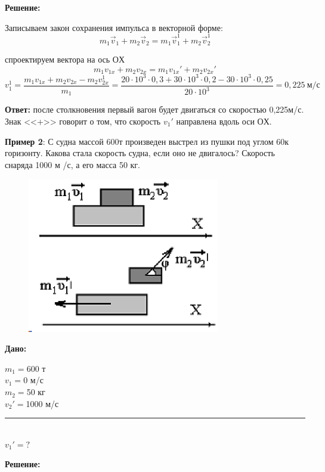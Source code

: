 \documentclass[a5paper, 10pt]{diss_4}
\renewcommand{\'}{\,'}
\begin{document}
  \textbf{Решение:}

Записываем закон сохранения импульса в векторной форме:
\[
m_1\vec{v}_1+m_2\vec{v}_2=m_1\vec{v}_1^1+m_2\vec{v}_2^1
\]

спроектируем вектора на ось $ОХ$
\[
m_1 v_{1x}+m_2 v_{2x}=m_1 v_{1x}'+m_2 {v}_{2x}'
\]
\[
v_1^1=\frac{m_1 v_{1x}+m_2 v_{2x}-m_2 v_{2x}^1}{m_1}=
\frac{20\cdot10^3\cdot0,3+30\cdot10^3\cdot0,2-30\cdot10^3\cdot0,25}{20\cdot10^3}=
0,225\ м/с
\]

\textbf{Ответ:} после столкновения первый вагон будет двигаться со скоростью 0,225м/с.
Знак <<+>>  говорит о том, что скорость ${v_1}'$ направлена вдоль оси $ОХ$.

 \textbf{Пример 2}: С судна массой 600т произведен выстрел из пушки под углом
60\textdegree к горизонту. Какова стала скорость судна, если оно не двигалось?
Скорость снаряда 1000 м /с, а его масса 50 кг.


\begin{figure}
\includegraphics[width=0.75\textwidth]{img/img_28.eps}
\end{figure}

\vspace*{2cm}
\hspace{1cm}\textbf{Дано:}\hspace{.3cm}
\parbox[t]{4cm}{
$m_1=$600 т\\
$v_1=$0 м/с\\
$m_2=$50 кг\\
$v_2'=$1000 м/с\\
\rule{4cm}{.4pt}\\
$v_1'=?$\\
}



\vspace{10pt}
  \textbf{Решение:}
\end{document}
